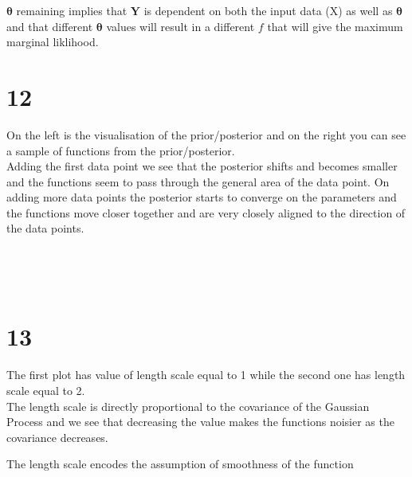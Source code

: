 \documentclass[11pt]{article}
\begin{document}
\(\boldsymbol{\theta}\) remaining implies that \(\boldsymbol{Y}\) is
dependent on both the input data (X) as well as \(\boldsymbol{\theta}\)
and that different \(\boldsymbol{\theta}\) values will result in a
different \(f\) that will give the maximum marginal liklihood.

    \section*{12}\label{section}

On the left is the visualisation of the prior/posterior and on the right
you can see a sample of functions from the prior/posterior.\\
Adding the first data point we see that the posterior shifts and becomes
smaller and the functions seem to pass through the general area of the
data point. On adding more data points the posterior starts to converge
on the parameters and the functions move closer together and are very
closely aligned to the direction of the data points.

    \begin{center}
    \end{center}
    { \hspace*{\fill} \\}
    
    \begin{center}
    \end{center}
    { \hspace*{\fill} \\}
    
    \section*{13}\label{section}

The first plot has value of length scale equal to 1 while the second one
has length scale equal to 2.\\
The length scale is directly proportional to the covariance of the
Gaussian Process and we see that decreasing the value makes the
functions noisier as the covariance decreases.

The length scale encodes the assumption of smoothness of the function
\end{document}
